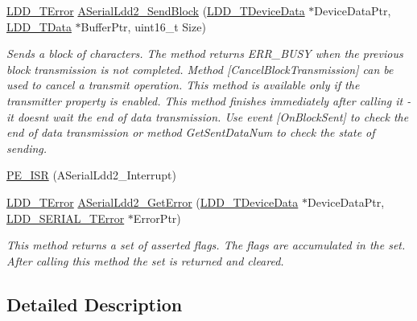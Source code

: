 \begin{DoxyCompactItemize}
\hyperlink{group___p_e___types__module_ga24c2b045fd04e79e85f261ce4df35588}{L\+D\+D\+\_\+\+T\+Error} \hyperlink{group___a_serial_ldd2__module_gabd167598efd957d04eb9bdd2e51ae673}{A\+Serial\+Ldd2\+\_\+\+Send\+Block} (\hyperlink{group___p_e___types__module_gac5cf1362f1f0e3a2ce71b1bf2276d091}{L\+D\+D\+\_\+\+T\+Device\+Data} $\ast$Device\+Data\+Ptr, \hyperlink{group___p_e___types__module_gade8ef9401405bd941b6da738b807f980}{L\+D\+D\+\_\+\+T\+Data} $\ast$Buffer\+Ptr, uint16\+\_\+t Size)
\begin{DoxyCompactList}\small\item\em Sends a block of characters. The method returns E\+R\+R\+\_\+\+B\+U\+SY when the previous block transmission is not completed. Method \mbox{[}Cancel\+Block\+Transmission\mbox{]} can be used to cancel a transmit operation. This method is available only if the transmitter property is enabled. This method finishes immediately after calling it -\/ it doesn\textquotesingle{}t wait the end of data transmission. Use event \mbox{[}On\+Block\+Sent\mbox{]} to check the end of data transmission or method Get\+Sent\+Data\+Num to check the state of sending. \end{DoxyCompactList}\item 
\hyperlink{group___a_serial_ldd2__module_ga8de88a30826abcdb10eeab68cc30bb09}{P\+E\+\_\+\+I\+SR} (A\+Serial\+Ldd2\+\_\+\+Interrupt)
\item 
\hyperlink{group___p_e___types__module_ga24c2b045fd04e79e85f261ce4df35588}{L\+D\+D\+\_\+\+T\+Error} \hyperlink{group___a_serial_ldd2__module_gafab1fb38c1ca4d64933a973a271ad7b0}{A\+Serial\+Ldd2\+\_\+\+Get\+Error} (\hyperlink{group___p_e___types__module_gac5cf1362f1f0e3a2ce71b1bf2276d091}{L\+D\+D\+\_\+\+T\+Device\+Data} $\ast$Device\+Data\+Ptr, \hyperlink{group___p_e___types__module_ga3bd5d57e02458ce220540d0ad0462e06}{L\+D\+D\+\_\+\+S\+E\+R\+I\+A\+L\+\_\+\+T\+Error} $\ast$Error\+Ptr)
\begin{DoxyCompactList}\small\item\em This method returns a set of asserted flags. The flags are accumulated in the set. After calling this method the set is returned and cleared. \end{DoxyCompactList}\end{DoxyCompactItemize}


\subsection{Detailed Description}


